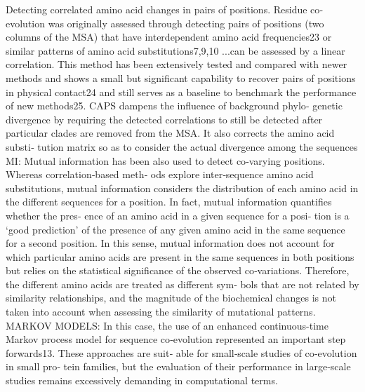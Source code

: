 Detecting correlated amino acid changes in pairs of positions. Residue co‐evolution was originally assessed through detecting pairs of positions (two columns of the MSA) that have interdependent amino acid frequencies23 or similar patterns of amino acid substitutions7,9,10 \cite{de2013emerging}
...can be assessed by a linear correlation. This method has been extensively tested and compared with newer methods and shows a small but significant capability to recover pairs of positions in physical contact24 and still serves as a baseline to benchmark the performance of new methods25.  \cite{de2013emerging}
CAPS dampens the influence of background phylo‐ genetic divergence by requiring the detected correlations to still be detected after particular clades are removed from the MSA. It also corrects the amino acid substi‐ tution matrix so as to consider the actual divergence among the sequences \cite{de2013emerging}
MI: Mutual information has been also used to detect co‐varying positions. Whereas correlation‐based meth‐ ods explore inter‐sequence amino acid substitutions, mutual information considers the distribution of each amino acid in the different sequences for a position. In fact, mutual information quantifies whether the pres‐ ence of an amino acid in a given sequence for a posi‐ tion is a `good prediction' of the presence of any given amino acid in the same sequence for a second position. In this sense, mutual information does not account for which particular amino acids are present in the same sequences in both positions but relies on the statistical significance of the observed co‐variations. Therefore, the different amino acids are treated as different sym‐ bols that are not related by similarity relationships, and the magnitude of the biochemical changes is not taken into account when assessing the similarity of mutational patterns. \cite{de2013emerging}
MARKOV MODELS: In this case, the use of an enhanced continuous-time Markov process model for sequence co‐evolution represented an important step forwards13. These approaches are suit‐ able for small‐scale studies of co‐evolution in small pro‐ tein families, but the evaluation of their performance in large‐scale studies remains excessively demanding in computational terms. \cite{de2013emerging}

